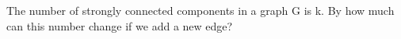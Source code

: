 The number of strongly connected components in a graph G is k. By how
much can this number change if we add a new edge?
